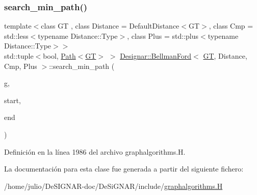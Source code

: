 \subsubsection{\texorpdfstring{search\+\_\+min\+\_\+path()}{search\_min\_path()}}
{\footnotesize\ttfamily template$<$class GT , class Distance  = Default\+Distance$<$\+G\+T$>$, class Cmp  = std\+::less$<$typename Distance\+::\+Type$>$, class Plus  = std\+::plus$<$typename Distance\+::\+Type$>$$>$ \\
std\+::tuple$<$bool, \hyperlink{class_designar_1_1_path}{Path}$<$\hyperlink{demo-buildgraph_8_c_a3001c40d2c31ca87ed96cd7d1334a55e}{GT}$>$ $>$ \hyperlink{class_designar_1_1_bellman_ford}{Designar\+::\+Bellman\+Ford}$<$ \hyperlink{demo-buildgraph_8_c_a3001c40d2c31ca87ed96cd7d1334a55e}{GT}, Distance, Cmp, Plus $>$\+::search\+\_\+min\+\_\+path (\begin{DoxyParamCaption}\item[{\hyperlink{demo-buildgraph_8_c_a3001c40d2c31ca87ed96cd7d1334a55e}{GT} \&}]{g,  }\item[{Node \&}]{start,  }\item[{Node \&}]{end }\end{DoxyParamCaption})\hspace{0.3cm}{\ttfamily [inline]}}



Definición en la línea 1986 del archivo graphalgorithms.\+H.



La documentación para esta clase fue generada a partir del siguiente fichero\+:\begin{DoxyCompactItemize}
\item 
/home/julio/\+De\+S\+I\+G\+N\+A\+R-\/doc/\+De\+Si\+G\+N\+A\+R/include/\hyperlink{graphalgorithms_8_h}{graphalgorithms.\+H}\end{DoxyCompactItemize}
